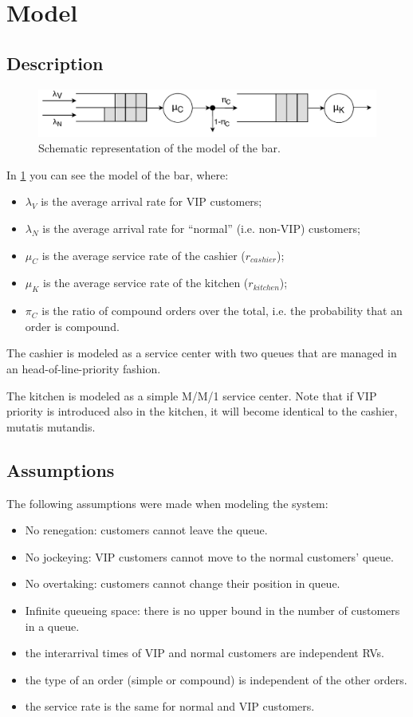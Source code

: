 \section{Model}

\subsection{Description}
\begin{figure}[h!]
    \centering
    \includegraphics[width=.75\textwidth]{figs/qt_model.pdf}
    \caption{Schematic representation of the model of the bar.}
    \label{fig:model}
\end{figure}

In \cref{fig:model} you can see the model of the bar, where:
\begin{itemize}
    \item $\lambda_V$ is the average arrival rate for VIP customers;
    \item $\lambda_N$ is the average arrival rate for ``normal'' (i.e. non-VIP) customers;
    \item $\mu_C$ is the average service rate of the cashier ($r_{cashier}$);
    \item $\mu_K$ is the average service rate of the kitchen ($r_{kitchen}$);
    \item $\pi_C$ is the ratio of compound orders over the total, i.e. the 
        probability that an order is compound.
\end{itemize}

The cashier is modeled as a service center with two queues that are managed 
in an head-of-line-priority fashion.

The kitchen is modeled as a simple M/M/1 service center. Note that if VIP 
priority is introduced also in the kitchen, it will become identical to the 
cashier, mutatis mutandis.

\subsection{Assumptions}
The following assumptions were made when modeling the system:
\begin{itemize}
    \item No renegation: customers cannot leave the queue.
    \item No jockeying: VIP customers cannot move to the normal customers' queue.
    \item No overtaking: customers cannot change their position in queue.
    \item Infinite queueing space: there is no upper bound in the number of 
        customers in a queue.
    \item the interarrival times of VIP and normal customers are independent 
        RVs.
    \item the type of an order (simple or compound) is independent of the other
        orders.
    \item the service rate is the same for normal and VIP customers.
\end{itemize}

